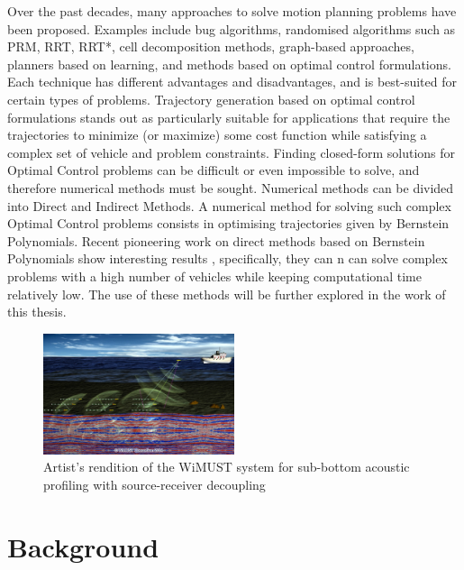 \par Over the past decades, many approaches to solve motion planning problems have been proposed. Examples include bug algorithms, randomised algorithms such as PRM, RRT, RRT*, cell decomposition methods, graph-based approaches, planners based on learning, and methods based on optimal control formulations. Each technique has different advantages and disadvantages, and is best-suited for certain types of problems. Trajectory generation based on optimal control formulations stands out as particularly suitable for applications that require the trajectories to minimize (or maximize) some cost function while satisfying a complex set of vehicle and problem constraints. Finding closed-form solutions for Optimal Control problems can be difficult or even impossible to solve, and therefore numerical methods must be sought. Numerical methods can be divided into Direct and Indirect Methods. A numerical method for solving such complex Optimal Control problems consists in optimising trajectories given by Bernstein Polynomials. Recent pioneering work on direct methods based on Bernstein Polynomials \cite{lorentz2013bernstein} show interesting results \cite{cichella2018bernstein}, specifically, they can n can solve complex problems with a high number of vehicles while keeping computational time relatively low. The use of these methods will be further explored in the work of this thesis.

\begin{figure}[h!]
    \centering
    \includegraphics[width=0.5\textwidth]{Images/projects/WiMUST_project.jpg}
    \caption{Artist’s rendition of the WiMUST system for sub-bottom acoustic profiling with source-receiver decoupling}
    \label{fig:WiMUST_System}
\end{figure}


\section{Background}

